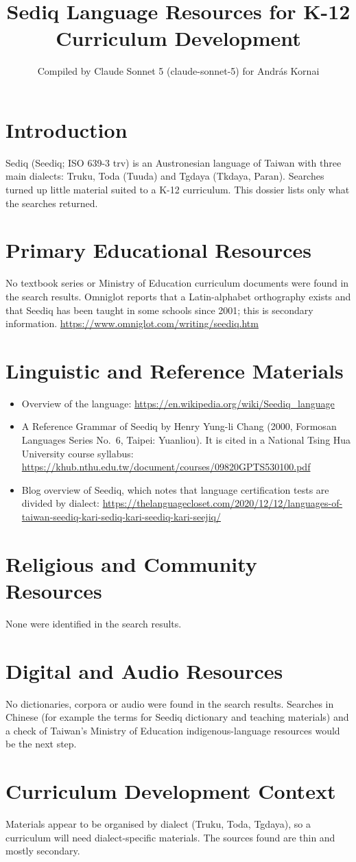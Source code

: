 \documentclass[12pt]{article}
\title{Sediq Language Resources for K-12 Curriculum Development}
\author{Compiled by Claude Sonnet 5 (claude-sonnet-5) for Andr\'as Kornai}
\date{}
\begin{document}
\maketitle
\section{Introduction}
Sediq (Seediq; ISO 639-3 trv) is an Austronesian language of Taiwan with three main dialects: Truku, Toda (Tuuda) and Tgdaya (Tkdaya, Paran). Searches turned up little material suited to a K-12 curriculum. This dossier lists only what the searches returned.
\section{Primary Educational Resources}
No textbook series or Ministry of Education curriculum documents were found in the search results. Omniglot reports that a Latin-alphabet orthography exists and that Seediq has been taught in some schools since 2001; this is secondary information. \url{https://www.omniglot.com/writing/seediq.htm}
\section{Linguistic and Reference Materials}
\begin{itemize}
\item Overview of the language: \url{https://en.wikipedia.org/wiki/Seediq_language}
\item A Reference Grammar of Seediq by Henry Yung-li Chang (2000, Formosan Languages Series No.~6, Taipei: Yuanliou). It is cited in a National Tsing Hua University course syllabus: \url{https://khub.nthu.edu.tw/document/courses/09820GPTS530100.pdf}
\item Blog overview of Seediq, which notes that language certification tests are divided by dialect: \url{https://thelanguagecloset.com/2020/12/12/languages-of-taiwan-seediq-kari-sediq-kari-seediq-kari-seejiq/}
\end{itemize}
\section{Religious and Community Resources}
None were identified in the search results.
\section{Digital and Audio Resources}
No dictionaries, corpora or audio were found in the search results. Searches in Chinese (for example the terms for Seediq dictionary and teaching materials) and a check of Taiwan's Ministry of Education indigenous-language resources would be the next step.
\section{Curriculum Development Context}
Materials appear to be organised by dialect (Truku, Toda, Tgdaya), so a curriculum will need dialect-specific materials. The sources found are thin and mostly secondary.
\end{document}
